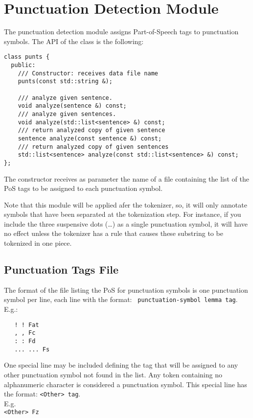 \documentclass[a4paper]{book}
\begin{document}
\section{Punctuation Detection Module}
\label{file-punt}

 The punctuation detection module assigns Part-of-Speech tags to
 punctuation symbols. The API of the class is the following:
\begin{verbatim}  
class punts {
  public:
    /// Constructor: receives data file name
    punts(const std::string &); 

    /// analyze given sentence.
    void analyze(sentence &) const;
    /// analyze given sentences.
    void analyze(std::list<sentence> &) const;
    /// return analyzed copy of given sentence
    sentence analyze(const sentence &) const;
    /// return analyzed copy of given sentences
    std::list<sentence> analyze(const std::list<sentence> &) const;
};
\end{verbatim}

 The constructor receives as parameter the name of a file containing
 the list of the PoS tags to be assigned to each punctuation symbol.

 Note that this module will be applied afer the tokenizer, so, it will
 only annotate symbols that have been separated at the tokenization
 step. For instance, if you include the three suspensive dots (\ldots)
 as a single punctuation symbol, it will have no effect unless the
 tokenizer has a rule that causes these substring to be tokenized in
 one piece.

\subsection{Punctuation Tags File}

 The format of the file listing the PoS for punctuation symbols is one
 punctuation symbol per line, each line with the format: {\tt
   punctuation-symbol lemma tag}.\\
 E.g.: 
\begin{verbatim}  
   ! ! Fat
   , , Fc
   : : Fd
   ... ... Fs
\end{verbatim}

  One special line may be included defining the tag that will be assigned to any other 
  punctuation symbol not found in the list. Any token containing no alphanumeric character 
  is considered a punctuation symbol.
  This special line has the format: \verb#<Other> tag#.\\
\noindent E.g.\\
    \verb#<Other> Fz#
\end{document}
